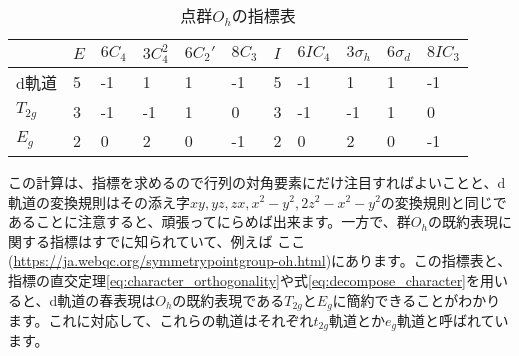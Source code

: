 \documentclass[uplatex,dvipdfmx,a4j,openany]{jsarticle}
\begin{document}
\begin{table}[htbp]
	\centering
	\begin{tabular}{lllllllllll}
			 & $E$ & $6C_4$ & $3C_4^2$ & $6C_2'$ & $8C_3$ & $I$ & $6IC_4$ & $3\sigma_h$ & $6\sigma_d$ & $8IC_3$ \\ \hline
	d軌道      & 5   & -1     & 1        & 1       & -1     & 5   & -1      & 1           & 1           & -1      \\
	$T_{2g}$ & 3   & -1     & -1       & 1       & 0      & 3   & -1      & -1          & 1           & 0       \\
	$E_g$    & 2   & 0      & 2        & 0       & -1     & 2   & 0       & 2           & 0           & -1     
	\end{tabular}
	\caption{点群$O_h$の指標表}
	\label{tab:character_table}
\end{table}

この計算は、指標を求めるので行列の対角要素にだけ注目すればよいことと、d軌道の変換規則はその添え字$xy, yz, zx, x^2-y^2, 2z^2-x^2-y^2$の変換規則と同じであることに注意すると、頑張ってにらめば出来ます。一方で、群$O_h$の既約表現に関する指標はすでに知られていて、例えば	ここ(\url{https://ja.webqc.org/symmetrypointgroup-oh.html})にあります。この指標表と、指標の直交定理\ref{eq:character_orthogonality}や式\ref{eq:decompose_character}を用いると、d軌道の春表現は$O_h$の既約表現である$T_{2g}$と$E_g$に簡約できることがわかります。これに対応して、これらの軌道はそれぞれ$t_{2g}$軌道とか$e_g$軌道と呼ばれています。



\end{document}
